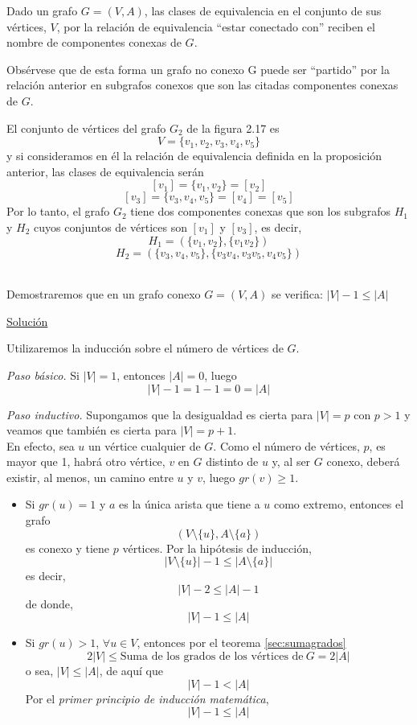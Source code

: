 \begin{fondo}
Dado un grafo $G = (V,A)$, las clases de equivalencia en el conjunto de sus vértices, $V$, por la relación de equivalencia ``estar conectado con'' reciben el nombre de componentes conexas de $G$.
\end{fondo}

Obsérvese que de esta forma un grafo no conexo G puede ser ``partido'' por la relación anterior en subgrafos conexos que son las citadas componentes conexas de $G$.

\begin{ejem}
El conjunto de vértices del grafo $G_2$ de la figura 2.17 es
\[V = \{v_1, v_2, v_3, v_4, v_5 \} \]
y si consideramos en él la relación de equivalencia definida en la proposición anterior, las clases de equivalencia serán
\[ [v_1] = \{v_1, v_2\} = [v_2] \]
\[ [v_3] = \{v_3, v_4, v_5\} = [v_4] = [v_5] \]
Por lo tanto, el grafo $G_2$ tiene dos componentes conexas que son los subgrafos $H_1$ y $H_2$ cuyos conjuntos de vértices son $[v_1]$ y $[v_3]$, es decir,
\[ H_1 = (\{v_1, v_2\}, \{v_1v_2\}) \]
\[ H_2 = (\{v_3, v_4, v_5\}, \{v_3v_4, v_3v_5, v_4v_5\}) \]
\\
\end{ejem}

\begin{ejem}
Demostraremos que en un grafo conexo $G = (V,A)$ se verifica: $|V| - 1 \leq |A|$\\
\end{ejem}

\underline{Solución}

Utilizaremos la inducción sobre el número de vértices de $G$.

\emph{Paso básico.} Si $|V| = 1$, entonces $|A| = 0$, luego
\[ |V| - 1 = 1 - 1 = 0 = |A| \]

\emph{Paso inductivo.} Supongamos que la desigualdad es cierta para $|V| = p$ con $p > 1$ y veamos que también es cierta para $|V| = p + 1$.\\

En efecto, sea $u$ un vértice cualquier de $G$. Como el número de vértices, $p$, es mayor que 1, habrá otro vértice, $v$ en $G$ distinto de $u$ y, al ser $G$ conexo, deberá existir, al menos, un camino entre $u$ y $v$, luego $gr(v) \ge 1$.\\

\begin{itemize}
\item Si $gr(u) = 1$ y $a$ es la única arista que tiene a $u$ como extremo, entonces el grafo
\[(V \setminus \{u\}, A \setminus \{a\})\]
es conexo y tiene $p$ vértices. Por la hipótesis de inducción,\\
\[ |V \setminus \{u\}| -1 \leq |A \setminus \{a\}| \]
es decir,
\[ |V| - 2 \leq |A| -1 \]
de donde,
\[ |V| - 1 \leq |A| \]
\item Si $gr(u) > 1$, $\forall u \in V$, entonces por el teorema \ref{sec:sumagrados}
\[ 2|V| \leq \mbox{Suma de los grados de los vértices de}\ G = 2|A| \]
o sea, $|V| \leq |A|$, de aquí que
\[ |V| - 1 < |A| \]
Por el \emph{primer principio de inducción matemática},
\[ |V| - 1 \leq |A| \]
\end{itemize}

